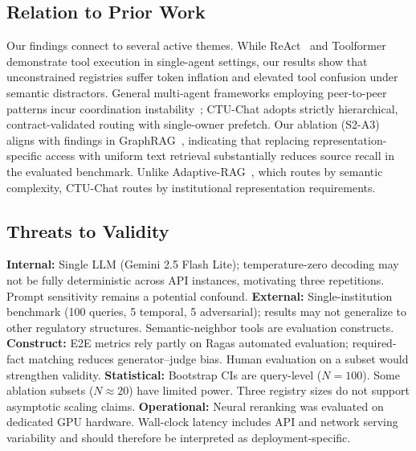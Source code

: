 \subsection{Relation to Prior Work}

Our findings connect to several active themes. While ReAct~\cite{yao2023react} and Toolformer~\cite{schick2023toolformer} demonstrate tool execution in single-agent settings, our results show that unconstrained registries suffer token inflation and elevated tool confusion under semantic distractors. General multi-agent frameworks employing peer-to-peer patterns incur coordination instability~\cite{wu2023autogen}; CTU-Chat adopts strictly hierarchical, contract-validated routing with single-owner prefetch. Our ablation (S2-A3) aligns with findings in GraphRAG~\cite{edge2024graphrag}, indicating that replacing representation-specific access with uniform text retrieval substantially reduces source recall in the evaluated benchmark. Unlike Adaptive-RAG~\cite{jeong2024adaptiverag}, which routes by semantic complexity, CTU-Chat routes by institutional representation requirements.

\subsection{Threats to Validity}
\label{sec:limitations}

\textbf{Internal:} Single LLM (Gemini 2.5 Flash Lite); temperature-zero decoding may not be fully deterministic across API instances, motivating three repetitions. Prompt sensitivity remains a potential confound.
\textbf{External:} Single-institution benchmark (100 queries, 5 temporal, 5 adversarial); results may not generalize to other regulatory structures. Semantic-neighbor tools are evaluation constructs.
\textbf{Construct:} E2E metrics rely partly on Ragas automated evaluation; required-fact matching reduces generator--judge bias. Human evaluation on a subset would strengthen validity.
\textbf{Statistical:} Bootstrap CIs are query-level ($N{=}100$). Some ablation subsets ($N{\approx}20$) have limited power. Three registry sizes do not support asymptotic scaling claims.
\textbf{Operational:} Neural reranking was evaluated on dedicated GPU hardware. Wall-clock latency includes API and network serving variability and should therefore be interpreted as deployment-specific.
